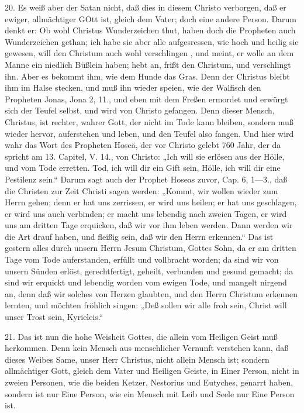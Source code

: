 20. Es weiß aber der Satan nicht, daß dies in diesem Christo verborgen, daß er ewiger, allmächtiger GOtt ist, gleich dem Vater; doch eine andere Person. Darum denkt er: Ob wohl Christus Wunderzeichen thut, haben doch die Propheten auch Wunderzeichen gethan; ich habe sie aber alle aufgesressen, wie hoch und heilig sie gewesen, will den Christum auch wohl verschlingen
, und meint, er wolle an dem Manne ein niedlich Büßlein haben; hebt an, frißt den Christum, und verschlingt ihn. Aber es bekommt ihm, wie dem Hunde das Gras. Denn der Christus bleibt ihm im Halse stecken, und muß ihn wieder speien, wie der Walfisch den Propheten Jonas, Jona 2, 11., und eben mit dem Freßen ermordet und erwürgt sich der Teufel selbst, und wird von Christo gefangen. Denn dieser Mensch, Christus, ist rechter, wahrer Gott, der nicht im Tode kann bleiben, sondern muß wieder hervor, auferstehen und leben, und den Teufel also fangen. Und hier wird wahr das Wort des Propheten Hoseä, der vor Christo gelebt 760 Jahr, der da spricht am 13. Capitel, V. 14., von Christo: „Ich will sie erlösen aus der Hölle, und vom Tode erretten. Tod, ich will dir ein Gift sein, Hölle, ich will dir eine Pestilenz sein.“ Darum sagt auch der Prophet Hoseas zuvor, Cap. 6, 1—3., daß die Christen zur Zeit Christi sagen werden: „Kommt, wir wollen wieder zum Herrn gehen; denn er hat uns zerrissen, er wird uns heilen; er hat uns geschlagen, er wird uns auch verbinden; er macht uns lebendig nach zweien Tagen, er wird uns am dritten Tage erquicken, daß wir vor ihm leben werden. Dann werden wir die Art drauf haben, und fleißig sein, daß wir den Herrn erkennen.“ Das ist gestern alles durch unsern Herrn Jesum Christum, Gottes Sohn, da er am dritten Tage vom Tode auferstanden, erfüllt und vollbracht worden; da sind wir von unsern Sünden erlöst, gerechtfertigt, geheilt, verbunden und gesund gemacht; da sind wir erquickt und lebendig worden vom ewigen Tode, und mangelt nirgend an, denn daß wir solches von Herzen glaubten, und den Herrn Christum erkennen lernten, und möchten fröhlich singen: „Deß sollen wir alle froh sein, Christ will unser Trost sein, Kyrieleis.“

21. Das ist nun die hohe Weisheit Gottes, die allein vom Heiligen Geist muß herkommen. Denn kein Mensch aus menschlicher Vernunft verstehen kann, daß dieses Weibes Same, unser Herr Christus, nicht allein Mensch ist; sondern allmächtiger Gott, gleich dem Vater und Heiligen Geiste, in Einer Person, nicht in zweien Personen, wie die beiden Ketzer, Nestorius und Eutyches, genarrt haben, sondern ist nur Eine Person, wie ein Mensch mit Leib und Seele nur Eine Person ist.

